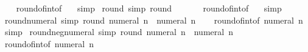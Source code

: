 \begin{isabellebody}
%
\isadelimproof
\ \ %
\endisadelimproof
%
\isatagproof
{}\isamarkupfalse%
\ round{\isacharunderscore}{\kern0pt}of{\isacharunderscore}{\kern0pt}int{\isacharbrackleft}{\kern0pt}of\ {}{\isacharbrackright}{\kern0pt}\ \isamarkupfalse%
\ simp%
\endisatagproof
{\isafoldproof}%
%
\isadelimproof
\isanewline
%
\endisadelimproof
\isanewline
{}\isamarkupfalse%
\ round{\isacharunderscore}{\kern0pt}{}\ {\isacharbrackleft}{\kern0pt}simp{\isacharbrackright}{\kern0pt}{\isacharcolon}{\kern0pt}\ {\isachardoublequoteopen}round\ {}\ {\isacharequal}{\kern0pt}\ {}{\isachardoublequoteclose}\isanewline
%
\isadelimproof
\ \ %
\endisadelimproof
%
\isatagproof
{}\isamarkupfalse%
\ round{\isacharunderscore}{\kern0pt}of{\isacharunderscore}{\kern0pt}int{\isacharbrackleft}{\kern0pt}of\ {}{\isacharbrackright}{\kern0pt}\ \isamarkupfalse%
\ simp%
\endisatagproof
{\isafoldproof}%
%
\isadelimproof
\isanewline
%
\endisadelimproof
\isanewline
{}\isamarkupfalse%
\ round{\isacharunderscore}{\kern0pt}numeral\ {\isacharbrackleft}{\kern0pt}simp{\isacharbrackright}{\kern0pt}{\isacharcolon}{\kern0pt}\ {\isachardoublequoteopen}round\ {\isacharparenleft}{\kern0pt}numeral\ n{\isacharparenright}{\kern0pt}\ {\isacharequal}{\kern0pt}\ numeral\ n{\isachardoublequoteclose}\isanewline
%
\isadelimproof
\ \ %
\endisadelimproof
%
\isatagproof
{}\isamarkupfalse%
\ round{\isacharunderscore}{\kern0pt}of{\isacharunderscore}{\kern0pt}int{\isacharbrackleft}{\kern0pt}of\ {\isachardoublequoteopen}numeral\ n{\isachardoublequoteclose}{\isacharbrackright}{\kern0pt}\ \isamarkupfalse%
\ simp%
\endisatagproof
{\isafoldproof}%
%
\isadelimproof
\isanewline
%
\endisadelimproof
\isanewline
{}\isamarkupfalse%
\ round{\isacharunderscore}{\kern0pt}neg{\isacharunderscore}{\kern0pt}numeral\ {\isacharbrackleft}{\kern0pt}simp{\isacharbrackright}{\kern0pt}{\isacharcolon}{\kern0pt}\ {\isachardoublequoteopen}round\ {\isacharparenleft}{\kern0pt}{\isacharminus}{\kern0pt}numeral\ n{\isacharparenright}{\kern0pt}\ {\isacharequal}{\kern0pt}\ {\isacharminus}{\kern0pt}numeral\ n{\isachardoublequoteclose}\isanewline
%
\isadelimproof
\ \ %
\endisadelimproof
%
\isatagproof
{}\isamarkupfalse%
\ round{\isacharunderscore}{\kern0pt}of{\isacharunderscore}{\kern0pt}int{\isacharbrackleft}{\kern0pt}of\ {\isachardoublequoteopen}{\isacharminus}{\kern0pt}numeral\ n{\isachardoublequoteclose}{\isacharbrackright}{\kern0pt}\ \isamarkupfalse%

\end{isabellebody}
